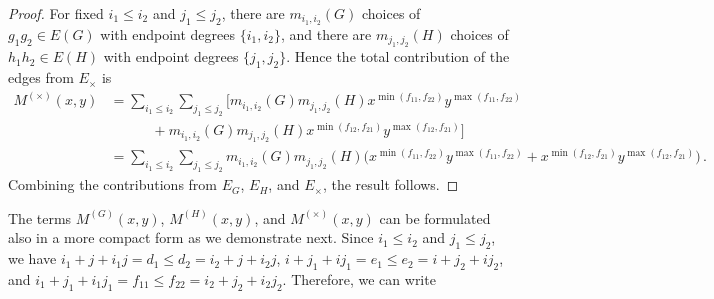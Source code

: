 \documentclass[letterpaper,12pt]{article}
\begin{document}
\begin{proof}
For fixed $i_1\le i_2$ and $j_1\le j_2$, there are $m_{i_1,i_2}(G)$ choices of $g_1g_2\in E(G)$ with endpoint degrees $\{i_1,i_2\}$, and there are $m_{j_1,j_2}(H)$ choices of $h_1h_2\in E(H)$ with endpoint degrees $\{j_1,j_2\}$. Hence the total contribution of the edges from $E_\times$ is
\[
\begin{aligned}
M^{(\times)}(x,y)
&=\sum_{i_1\le i_2}\sum_{j_1\le j_2}
\Big[
m_{i_1,i_2}(G)  m_{j_1,j_2}(H) 
x^{\min(f_{11},f_{22})} y^{\max(f_{11},f_{22})}
\\
&\quad\quad\quad
+
m_{i_1,i_2}(G)  m_{j_1,j_2}(H) 
x^{\min(f_{12},f_{21})} y^{\max(f_{12},f_{21})}
\Big]
\\
&=
\sum_{i_1\le i_2}\sum_{j_1\le j_2}
m_{i_1,i_2}(G)  m_{j_1,j_2}(H) \Big(
x^{\min(f_{11},f_{22})} y^{\max(f_{11},f_{22})}
+
x^{\min(f_{12},f_{21})} y^{\max(f_{12},f_{21})}
\Big)\,.
\end{aligned}
\]
Combining the contributions from $E_G$, $E_H$, and $E_\times$, the result follows. 
\end{proof}

The terms $M^{(G)}(x,y)$, $ M^{(H)}(x,y)$, and $ M^{(\times)}(x,y)$ can be formulated also in a more compact form as we demonstrate next. Since $i_1\leq i_2$ and $j_1\leq j_2$, we have $i_1 + j + i_1j = d_1\le d_2 = i_2 + j + i_2j$, $i + j_1 + ij_1 = e_1\le e_2 = i + j_2 + ij_2$, and $i_1 + j_1 + i_1j_1 = f_{11}\le f_{22} = i_2 + j_2 + i_2j_2$. Therefore,  we can write
\end{document}
